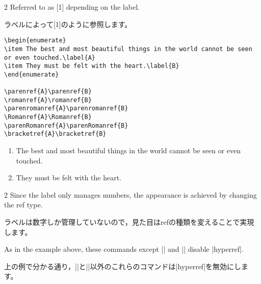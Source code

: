 \documentclass[%
fleqn,%
paper=a4paper,%
fontsize=10pt,%
open_bracket_pos=zenkakunibu_nibu,%
hanging_punctuation,%
]%
{jlreq}
\newenvironment{translateing}%
{\begin{multicolpar}{2}}
{\end{multicolpar}\vspace{\baselineskip}}
\begin{document}

\begin{translateing}
Referred to as [1] depending on the label.

ラベルによって[1]のように参照します。
\end{translateing}


\begin{lstlisting}
\begin{enumerate}
\item The best and most beautiful things in the world cannot be seen or even touched.\label{A}
\item They must be felt with the heart.\label{B}
\end{enumerate}

\parenref{A}\parenref{B}
\romanref{A}\romanref{B}
\parenromanref{A}\parenromanref{B}
\Romanref{A}\Romanref{B}
\parenRomanref{A}\parenRomanref{B}
\bracketref{A}\bracketref{B}
\end{lstlisting}

\begin{macroexample}
\begin{enumerate}
\item The best and most beautiful things in the world cannot be seen or even touched.\label{A}
\item They must be felt with the heart.\label{B}
\end{enumerate}

\end{macroexample}

\begin{translateing}
Since the label only manages numbers, the appearance is achieved by changing the ref type.

ラベルは数字しか管理していないので，見た目はrefの種類を変えることで実現します。

As in the example above, these commands except |\parenref| and |\bracketref| disable |hyperref|.

上の例で分かる通り，|\parenref|と|\bracketref|以外のこれらのコマンドは|hyperref|を無効にします。
\end{translateing}

\newpage
{}
\end{document}
